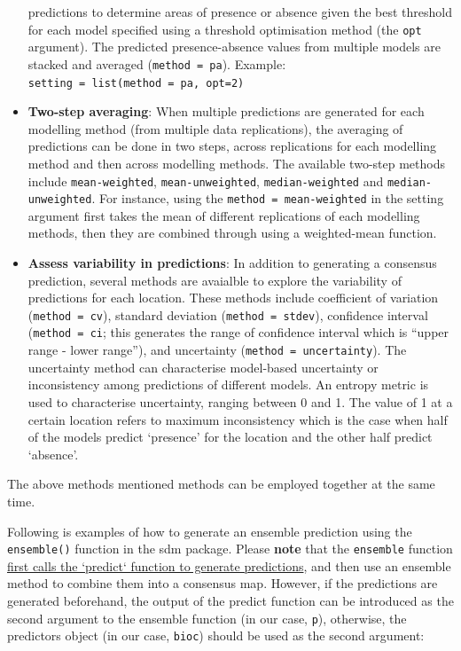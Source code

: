\documentclass[
]{article}
\begin{document}
\begin{itemize}
  predictions to determine areas of presence or absence given the best
  threshold for each model specified using a threshold optimisation
  method (the \texttt{opt} argument). The predicted presence-absence
  values from multiple models are stacked and averaged
  (\texttt{method\ =\ \textquotesingle{}pa\textquotesingle{}}). Example:
  \texttt{setting\ =\ list(method\ =\ \textquotesingle{}pa\textquotesingle{},\ opt=2)}
\item
  \textbf{Two-step averaging}: When multiple predictions are generated
  for each modelling method (from multiple data replications), the
  averaging of predictions can be done in two steps, across replications
  for each modelling method and then across modelling methods. The
  available two-step methods include \texttt{mean-weighted},
  \texttt{mean-unweighted}, \texttt{median-weighted} and
  \texttt{median-unweighted}. For instance, using the
  \texttt{method\ =\ \textquotesingle{}mean-weighted\textquotesingle{}}
  in the setting argument first takes the mean of different replications
  of each modelling methods, then they are combined through using a
  weighted-mean function.
\item
  \textbf{Assess variability in predictions}: In addition to generating
  a consensus prediction, several methods are avaialble to explore the
  variability of predictions for each location. These methods include
  coefficient of variation
  (\texttt{method\ =\ \textquotesingle{}cv\textquotesingle{}}), standard
  deviation
  (\texttt{method\ =\ \textquotesingle{}stdev\textquotesingle{}}),
  confidence interval
  (\texttt{method\ =\ \textquotesingle{}ci\textquotesingle{}}; this
  generates the range of confidence interval which is ``upper range -
  lower range''), and uncertainty
  (\texttt{method\ =\ \textquotesingle{}uncertainty\textquotesingle{}}).
  The uncertainty method can characterise model-based uncertainty or
  inconsistency among predictions of different models. An entropy metric
  is used to characterise uncertainty, ranging between 0 and 1. The
  value of 1 at a certain location refers to maximum inconsistency which
  is the case when half of the models predict `presence' for the
  location and the other half predict `absence'.
\end{itemize}

The above methods mentioned methods can be employed together at the same
time.

Following is examples of how to generate an ensemble prediction using
the \texttt{ensemble()} function in the sdm package. Please
\textbf{note} that the \texttt{ensemble} function
\uline{first calls the `predict` function to generate predictions}, and
then use an ensemble method to combine them into a consensus map.
However, if the predictions are generated beforehand, the output of the
predict function can be introduced as the second argument to the
ensemble function (in our case, \texttt{p}), otherwise, the predictors
object (in our case, \texttt{bioc}) should be used as the second
argument:
\end{document}
